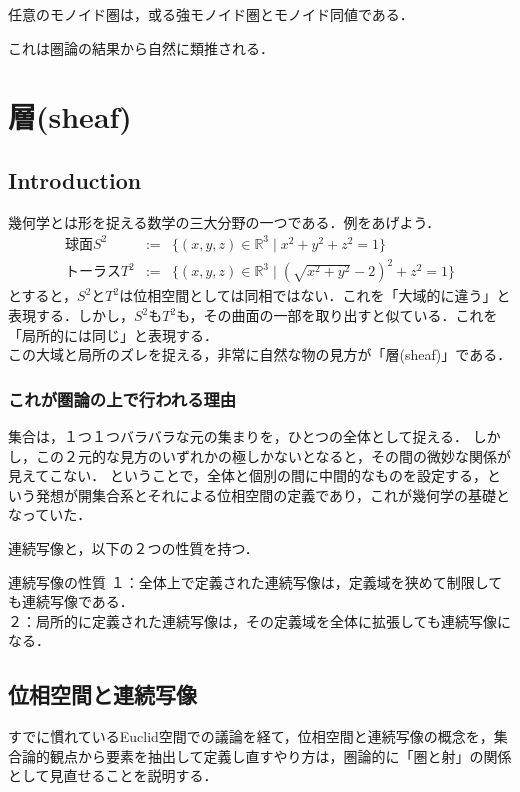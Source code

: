 \documentclass[uplatex, 12pt, dvipdfmx]{jsreport}
\begin{document}
\begin{proposition}
    任意のモノイド圏は，或る強モノイド圏とモノイド同値である．
\end{proposition}
これは圏論の結果から自然に類推される．

\part{層(sheaf)}

\chapter{Introduction}

幾何学とは形を捉える数学の三大分野の一つである．例をあげよう．
\begin{eqnarray*}球面S^2 &:=& \{ (x,y,z) \in \mathbb{R}^3 \mid x^2+y^2+z^2 = 1 \} \\ トーラスT^2 &:=& \{ (x,y,z)\in\mathbb{R}^3 \mid (\sqrt{x^2+y^2}-2)^2 + z^2 = 1 \}\end{eqnarray*}
とすると，$S^2$と$T^2$は位相空間としては同相ではない．これを「大域的に違う」と表現する．しかし，$S^2$も$T^2$も，その曲面の一部を取り出すと似ている．これを「局所的には同じ」と表現する．\\
この大域と局所のズレを捉える，非常に自然な物の見方が「層(sheaf)」である．

\section{これが圏論の上で行われる理由}

集合は，１つ１つバラバラな元の集まりを，ひとつの全体として捉える．
しかし，この２元的な見方のいずれかの極しかないとなると，その間の微妙な関係が見えてこない．
ということで，全体と個別の間に中間的なものを設定する，という発想が開集合系とそれによる位相空間の定義であり，これが幾何学の基礎となっていた．


連続写像と，以下の２つの性質を持つ．
\begin{itembox}[l]{連続写像の性質}
    １：全体上で定義された連続写像は，定義域を狭めて制限しても連続写像である．\\
    ２：局所的に定義された連続写像は，その定義域を全体に拡張しても連続写像になる．
\end{itembox}

\chapter{位相空間と連続写像}
すでに慣れているEuclid空間での議論を経て，位相空間と連続写像の概念を，集合論的観点から要素を抽出して定義し直すやり方は，圏論的に「圏と射」の関係として見直せることを説明する．
\end{document}
